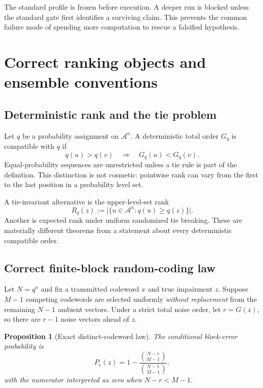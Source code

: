 \documentclass[11pt]{article}
\newtheorem{proposition}{Proposition}
\newcommand{\A}{\mathcal A}
\begin{document}
The standard profile is frozen before execution.  A deeper run is blocked unless the standard gate first identifies a surviving claim.  This prevents the common failure mode of spending more computation to rescue a falsified hypothesis.

\section{Correct ranking objects and ensemble conventions}

\subsection{Deterministic rank and the tie problem}

Let $q$ be a probability assignment on $\A^n$.  A deterministic total order $G_q$ is compatible with $q$ if
\[
 q(u)>q(v)\quad\Longrightarrow\quad G_q(u)<G_q(v).
\]
Equal-probability sequences are unrestricted unless a tie rule is part of the definition.  This distinction is not cosmetic: pointwise rank can vary from the first to the last position in a probability level set.

A tie-invariant alternative is the upper-level-set rank
\begin{equation}
  R_q(z):=\bigl|\{u\in\A^n:q(u)\ge q(z)\}\bigr|.
  \label{eq:levelrank}
\end{equation}
Another is expected rank under uniform randomized tie breaking.  These are materially different theorems from a statement about every deterministic compatible order.

\subsection{Correct finite-block random-coding law}

Let $N=q^n$ and fix a transmitted codeword $x$ and true impairment $z$.  Suppose $M-1$ competing codewords are selected uniformly \emph{without replacement} from the remaining $N-1$ ambient vectors.  Under a strict total noise order, let $r=G(z)$, so there are $r-1$ noise vectors ahead of $z$.

\begin{proposition}[Exact distinct-codeword law]
The conditional block-error probability is
\begin{equation}
 P_e(z)
 =1-\frac{\binom{N-r}{M-1}}{\binom{N-1}{M-1}},
 \label{eq:hypergeom}
\end{equation}
with the numerator interpreted as zero when $N-r<M-1$.
\end{proposition}
\end{document}
